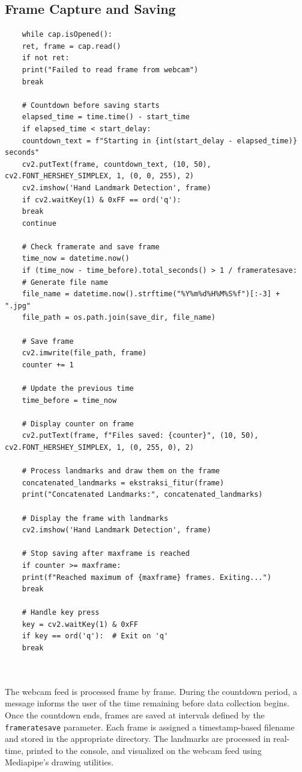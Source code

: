 \subsection{Frame Capture and Saving}
\begin{lstlisting}
	while cap.isOpened():
	ret, frame = cap.read()
	if not ret:
	print("Failed to read frame from webcam")
	break
	
	# Countdown before saving starts
	elapsed_time = time.time() - start_time
	if elapsed_time < start_delay:
	countdown_text = f"Starting in {int(start_delay - elapsed_time)} seconds"
	cv2.putText(frame, countdown_text, (10, 50), cv2.FONT_HERSHEY_SIMPLEX, 1, (0, 0, 255), 2)
	cv2.imshow('Hand Landmark Detection', frame)
	if cv2.waitKey(1) & 0xFF == ord('q'):
	break
	continue
	
	# Check framerate and save frame
	time_now = datetime.now()
	if (time_now - time_before).total_seconds() > 1 / frameratesave:
	# Generate file name
	file_name = datetime.now().strftime("%Y%m%d%H%M%S%f")[:-3] + ".jpg"
	file_path = os.path.join(save_dir, file_name)
	
	# Save frame
	cv2.imwrite(file_path, frame)
	counter += 1
	
	# Update the previous time
	time_before = time_now
	
	# Display counter on frame
	cv2.putText(frame, f"Files saved: {counter}", (10, 50), cv2.FONT_HERSHEY_SIMPLEX, 1, (0, 255, 0), 2)
	
	# Process landmarks and draw them on the frame
	concatenated_landmarks = ekstraksi_fitur(frame)
	print("Concatenated Landmarks:", concatenated_landmarks)
	
	# Display the frame with landmarks
	cv2.imshow('Hand Landmark Detection', frame)
	
	# Stop saving after maxframe is reached
	if counter >= maxframe:
	print(f"Reached maximum of {maxframe} frames. Exiting...")
	break
	
	# Handle key press
	key = cv2.waitKey(1) & 0xFF
	if key == ord('q'):  # Exit on 'q'
	break
	
	
\end{lstlisting}

The webcam feed is processed frame by frame. During the countdown period, a message informs the user of the time remaining before data collection begins. Once the countdown ends, frames are saved at intervals defined by the \verb|frameratesave| parameter. Each frame is assigned a timestamp-based filename and stored in the appropriate directory. The landmarks are processed in real-time, printed to the console, and visualized on the webcam feed using Mediapipe’s drawing utilities.

